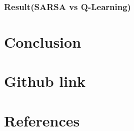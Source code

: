 \documentclass[11pt, a4]{article}
\begin{document}
			\subsubsection{Result(SARSA vs Q-Learning)}
	\section{Conclusion}
	\section{Github link}	
		 \href{https://github.com/RitabrataMandal/RL-DA6400-assignment_1}{}

	\section{References}
\end{document}
